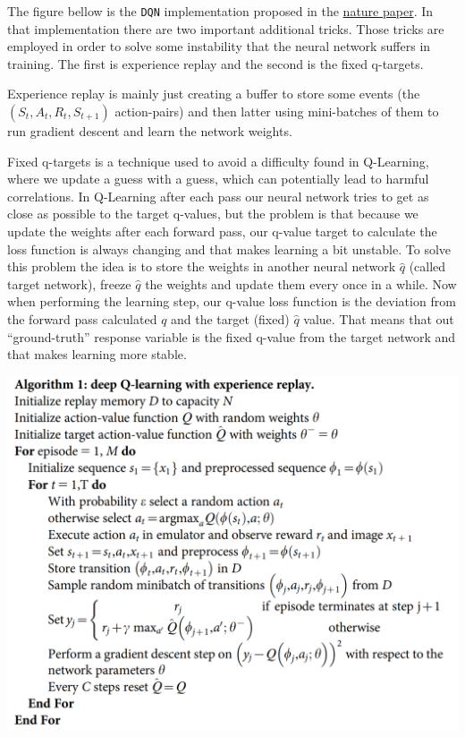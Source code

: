 \documentclass[
]{article}
\begin{document}
The figure bellow is the \texttt{DQN} implementation proposed in the
\href{https://storage.googleapis.com/deepmind-media/dqn/DQNNaturePaper.pdf}{nature
paper}. In that implementation there are two important additional
tricks. Those tricks are employed in order to solve some instability
that the neural network suffers in training. The first is experience
replay and the second is the fixed q-targets.

Experience replay is mainly just creating a buffer to store some events
(the \((S_{t},A_{t},R_{t},S_{t+1})\) action-pairs) and then latter using
mini-batches of them to run gradient descent and learn the network
weights.

Fixed q-targets is a technique used to avoid a difficulty found in
Q-Learning, where we update a guess with a guess, which can potentially
lead to harmful correlations. In Q-Learning after each pass our neural
network tries to get as close as possible to the target q-values, but
the problem is that because we update the weights after each forward
pass, our q-value target to calculate the loss function is always
changing and that makes learning a bit unstable. To solve this problem
the idea is to store the weights in another neural network \(\hat{q}\)
(called target network), freeze \(\hat{q}\) the weights and update them
every once in a while. Now when performing the learning step, our
q-value loss function is the deviation from the forward pass calculated
\(q\) and the target (fixed) \(\hat{q}\) value. That means that out
``ground-truth'' response variable is the fixed q-value from the target
network and that makes learning more stable.

\includegraphics{imgs/dqn_print_1.png}
\end{document}
